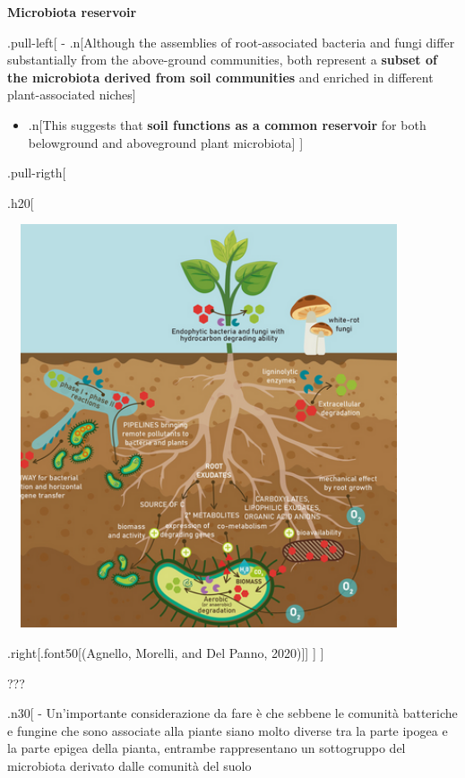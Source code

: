 \documentclass[
]{article}
\providecommand{\tightlist}{%
  \setlength{\itemsep}{0pt}\setlength{\parskip}{0pt}}
\begin{document}
\textbf{Microbiota reservoir}

.pull-left{[} - .n{[}Although the assemblies of root-associated bacteria
and fungi differ substantially from the above-ground communities, both
represent a \textbf{subset of the microbiota derived from soil
communities} and enriched in different plant-associated niches{]}

\begin{itemize}
\tightlist
\item
  .n{[}This suggests that \textbf{soil functions as a common reservoir}
  for both belowground and aboveground plant microbiota{]} {]}
\end{itemize}

.pull-rigth{[}

.h20{[}

\begin{center}\includegraphics[width=450px,height=450px]{images/reservoir} \end{center}

.right{[}.font50{[}(Agnello, Morelli, and Del Panno, 2020){]}{]} {]} {]}

???

.n30{[} - Un'importante considerazione da fare è che sebbene le comunità
batteriche e fungine che sono associate alla piante siano molto diverse
tra la parte ipogea e la parte epigea della pianta, entrambe
rappresentano un sottogruppo del microbiota derivato dalle comunità del
suolo
\end{document}
